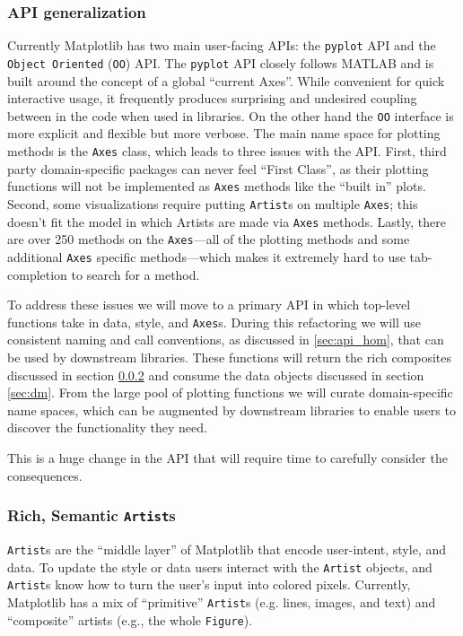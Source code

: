 \documentclass[11pt]{article}  %
\begin{document}
\subsubsection{API generalization}
\label{sec:api_gen}
Currently Matplotlib has two main user-facing APIs: the
\texttt{pyplot} API and the \texttt{Object Oriented} (\texttt{OO})
API.  The \texttt{pyplot} API closely follows MATLAB and is built
around the concept of a global ``current Axes''.  While convenient for
quick interactive usage, it frequently produces surprising and
undesired coupling between in the code when used in libraries.  On the
other hand the \texttt{OO} interface is more explicit and flexible but
more verbose.  The main name space for plotting methods is
the \texttt{Axes} class, which leads to three issues with the API.
First, third party domain-specific packages can never feel ``First
Class'', as their plotting functions will not be implemented as \texttt{Axes} methods like
the ``built in'' plots.  Second, some visualizations require putting
\texttt{Artist}s on multiple \texttt{Axes}; this doesn't fit the model
in which Artists are made via \texttt{Axes} methods.  Lastly, there are over 250
methods on the \texttt{Axes}---all of the plotting methods and some
additional \texttt{Axes} specific methods---which makes it extremely
hard to use tab-completion to search for a method.

To address these issues we will move to a primary API in which top-level
functions take
in data, style, and \texttt{Axes}s.  During this
refactoring we will use consistent naming and call conventions, as
discussed in \ref{sec:api_hom}, that can be used by downstream
libraries.  These functions will return the rich composites discussed
in section \ref{sec:artists} and consume the data objects discussed in
section \ref{sec:dm}.  From the large pool of plotting functions we
will curate domain-specific name spaces, which can be augmented by
downstream libraries to enable users to discover the functionality
they need.

This is a huge change in the API that will require time to carefully
consider the consequences.



\subsubsection{Rich, Semantic \texttt{Artist}s}
\label{sec:artists}
\texttt{Artist}s are the ``middle layer'' of Matplotlib that encode
user-intent, style, and data.
To update the style or data users interact with the \texttt{Artist}
objects, and \texttt{Artist}s know how to turn the user's input into
colored pixels.
Currently, Matplotlib has a mix of ``primitive'' \texttt{Artist}s
(e.g. lines, images, and text) and ``composite'' artists (e.g.,
the whole \texttt{Figure}).
\end{document}
